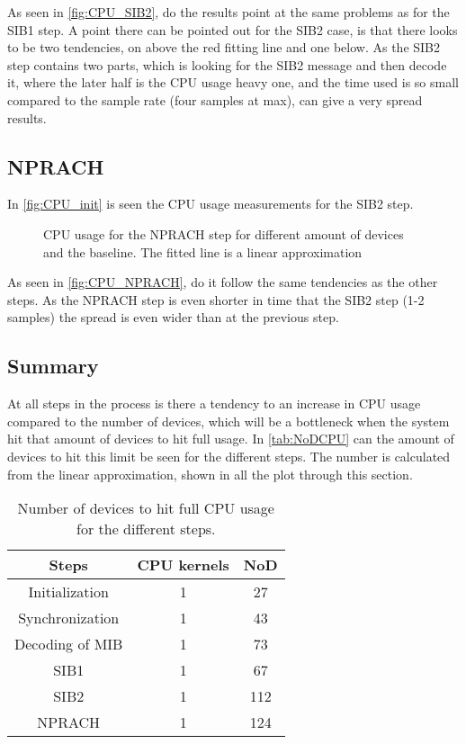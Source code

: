 As seen in \autoref{fig:CPU_SIB2}, do the results point at the same problems as for the SIB1 step. A point there can be pointed out for the SIB2 case, is that there looks to be two tendencies, on above the red fitting line and one below. As the SIB2 step contains two parts, which is looking for the SIB2 message and then decode it, where the later half is the CPU usage heavy one, and the time used is so small compared to the sample rate (four samples at max), can give a very spread results. 

\subsection{NPRACH}
In \autoref{fig:CPU_init} is seen the CPU usage measurements for the SIB2 step.

\begin{figure}[H]
\centering
\resizebox{0.5\textwidth}{!}{
}
\caption{CPU usage for the NPRACH step for different amount of devices and the baseline. The fitted line is a linear approximation}
\label{fig:CPU_NPRACH}
\end{figure}

As seen in \autoref{fig:CPU_NPRACH}, do it follow the same tendencies as the other steps. As the NPRACH step is even shorter in time that the  SIB2 step (1-2 samples) the spread is even wider than at the previous step.

\subsection{Summary}
At all steps in the process is there a tendency to an increase in CPU usage compared to the number of devices, which will be a bottleneck when the system hit that amount of devices to hit full usage. In \autoref{tab:NoDCPU} can the amount of devices to hit this limit be seen for the different steps. The number is calculated from the linear approximation, shown in all the plot through this section.

\begin{table}[H]
\centering
\begin{tabular}{|c|c|c|}
\hline
Steps & CPU kernels & NoD \\
\hline
Initialization & 1 & 27 \\
\hline
Synchronization & 1 & 43 \\
\hline
Decoding of MIB & 1 & 73 \\
\hline
SIB1 & 1 & 67 \\
\hline
SIB2 & 1 & 112 \\
\hline
NPRACH & 1 & 124 \\
\hline
\end{tabular}
\caption{Number of devices to hit full CPU usage for the different steps.}
\label{tab:NoDCPU}
\end{table}

